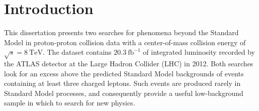 \chapter{Introduction}





This dissertation presents two searches for phenomena beyond the Standard Model in proton-proton collision data with a center-of-mass collision energy of $\sqrt{s}=\SI{8}{\tera\electronvolt}$. The dataset contains $\SI{20.3}{\femto\barn\tothe{-1}}$ of integrated luminosity recorded by the ATLAS detector at the Large Hadron Collider (LHC) in 2012. Both searches look for an excess above the predicted Standard Model backgrounds of events containing at least three charged leptons. Such events are produced rarely in Standard Model processes, and consequently provide a useful low-background sample in which to search for new physics. 

